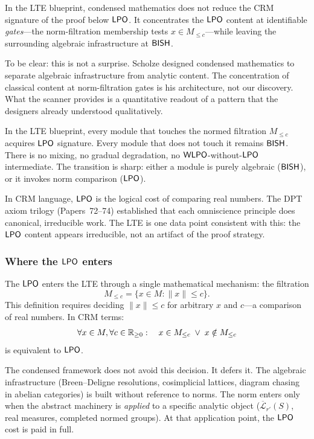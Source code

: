 \begin{observation}
In the LTE blueprint, condensed mathematics does not reduce the CRM
signature of the proof below $\textsf{LPO}$.  It concentrates the $\textsf{LPO}$
content at identifiable \emph{gates}---the norm-filtration membership
tests $x \in M_{\leq c}$---while leaving the surrounding algebraic
infrastructure at $\textsf{BISH}$.
\end{observation}

To be clear: this is not a surprise.  Scholze designed condensed
mathematics to separate algebraic infrastructure from analytic
content.  The concentration of classical content at norm-filtration
gates is his architecture, not our discovery.  What the scanner
provides is a quantitative readout of a pattern that the designers
already understood qualitatively.

In the LTE blueprint, every module that touches the normed filtration
$M_{\leq c}$ acquires $\textsf{LPO}$ signature.  Every module that does not
touch it remains $\textsf{BISH}$.  There is no mixing, no gradual degradation,
no $\textsf{WLPO}$-without-$\textsf{LPO}$ intermediate.  The transition is sharp:
either a module is purely algebraic ($\textsf{BISH}$), or it invokes norm
comparison ($\textsf{LPO}$).

In CRM language, $\textsf{LPO}$ is the logical cost of comparing real numbers.
The DPT axiom trilogy (Papers~72--74) established that each
omniscience principle does canonical, irreducible work.  The LTE is
one data point consistent with this: the $\textsf{LPO}$ content appears
irreducible, not an artifact of the proof strategy.

\subsubsection{Where the $\textsf{LPO}$ enters}\label{sec:where-lpo}

The $\textsf{LPO}$ enters the LTE through a single mathematical mechanism:
the filtration
\[
  M_{\leq c} = \{x \in M : \|x\| \leq c\}.
\]
This definition requires deciding $\|x\| \leq c$ for arbitrary $x$
and $c$---a comparison of real numbers.  In CRM terms:
\[
  \forall x \in M, \forall c \in \mathbb{R}_{\geq 0}: \quad
  x \in M_{\leq c} \;\lor\; x \notin M_{\leq c}
\]
is equivalent to $\textsf{LPO}$.

The condensed framework does not avoid this decision.  It defers it.
The algebraic infrastructure (Breen--Deligne resolutions, cosimplicial
lattices, diagram chasing in abelian categories) is built without
reference to norms.  The norm enters only when the abstract machinery
is \emph{applied} to a specific analytic object ($\overline{\mathcal{L}}_{r'}(S)$,
real measures, completed normed groups).  At that application point,
the $\textsf{LPO}$ cost is paid in full.

